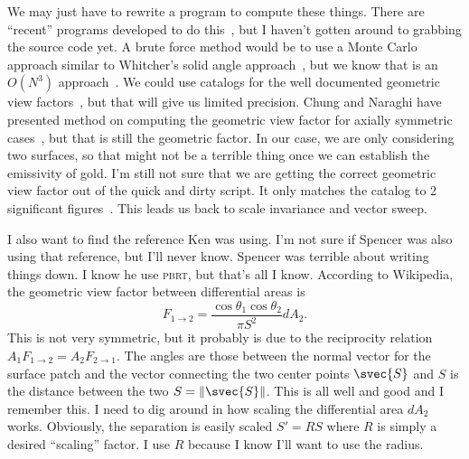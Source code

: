 We may just have to rewrite a program to compute these things.  There
are ``recent'' programs developed to do
this~\cite{walton_calculation_2002}, but I haven't gotten around to
grabbing the source code yet.  A brute force method would be to use a
Monte Carlo approach similar to Whitcher's solid angle
approach~\cite{whitcher_monte_2012}, but we know that is an \(O(N^3)\)
approach~\cite{walton_calculation_2002}.  We could use catalogs for the
well documented geometric view factors~\cite{howell_catalog_2010}, but
that will give us limited precision.  Chung and Naraghi have presented
method on computing the geometric view factor for axially symmetric
cases~\cite{chung_simpler_1982, naraghi_radiation_1982,
chung_formulation_1984}, but that is still the geometric factor.  In our
case, we are only considering two surfaces, so that might not be a
terrible thing once we can establish the emissivity of gold.  I'm still
not sure that we are getting the correct geometric view factor out of
the quick and dirty script.  It only matches the catalog to 2
significant figures~\cite{howell_catalog_2010}.  This leads us back to
scale invariance and vector sweep.

I also want to find the reference Ken was using.  I'm not sure if
Spencer was also using that reference, but I'll never know.  Spencer was
terrible about writing things down.  I know he use \textsc{pbrt}, but
that's all I know.  According to Wikipedia, the geometric view factor
between differential areas is
\begin{equation}
    F_{1\to2} = \frac{\cos\theta_1\cos\theta_2}{\pi S^2} dA_2.
\end{equation}
This is not very symmetric, but it probably is due to the reciprocity
relation \(A_1F_{1\to2} = A_2F_{2\to1}\).  The angles are those between
the normal vector for the surface patch and the vector connecting the
two center points \(\svec{S}\) and \(S\) is the distance between the two
\(S = \lVert\svec{S}\rVert\).  This is all well and good and I remember
this.  I need to dig around in how scaling the differential area
\(dA_2\) works.  Obviously, the separation is easily scaled \(S' = R S\)
where \(R\) is simply a desired ``scaling'' factor.  I use \(R\) because
I know I'll want to use the radius.

